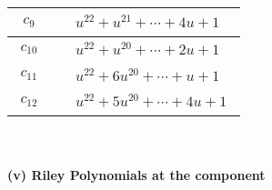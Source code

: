 \documentclass[1p]{elsarticle_modified}
\theoremstyle{definition}
\begin{document}
\begin{tabular}{m{50pt}|m{274pt}}
\hline $$\begin{aligned}c_{9}\end{aligned}$$&$\begin{aligned}
&u^{22}+u^{21}+\cdots+4 u+1
\end{aligned}$\\
\hline $$\begin{aligned}c_{10}\end{aligned}$$&$\begin{aligned}
&u^{22}+u^{20}+\cdots+2 u+1
\end{aligned}$\\
\hline $$\begin{aligned}c_{11}\end{aligned}$$&$\begin{aligned}
&u^{22}+6 u^{20}+\cdots+u+1
\end{aligned}$\\
\hline $$\begin{aligned}c_{12}\end{aligned}$$&$\begin{aligned}
&u^{22}+5 u^{20}+\cdots+4 u+1
\end{aligned}$\\
\hline
\end{tabular}\\~\\
\newpage\renewcommand{\arraystretch}{1}
\flushleft \textbf{(v) Riley Polynomials at the component}\newline \\
\end{document}
